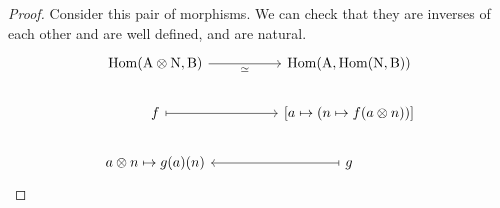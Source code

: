 \section{}
\begin{proof}
    Consider this pair of morphisms. We can check that they are inverses of each other and are well defined, and are natural.
    \[\begin{tikzcd}
	{\rm{Hom}(A\otimes N,B)} && {\rm{Hom}(A,\rm{Hom}(N,B))} \\
	f && {[a\mapsto (n\mapsto f(a\otimes n))]} \\
	{a\otimes n\mapsto g(a)(n)} && g
	\arrow["\simeq"', from=1-1, to=1-3]
	\arrow[maps to, from=2-1, to=2-3]
	\arrow[maps to, from=3-3, to=3-1]
\end{tikzcd}\]
\end{proof}



